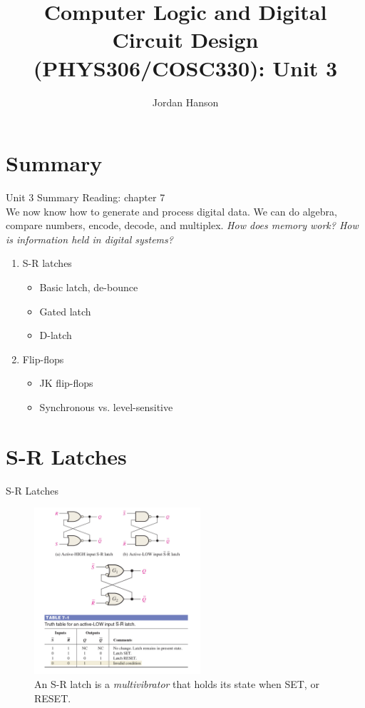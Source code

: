 \documentclass{beamer}
\title{Computer Logic and Digital Circuit Design (PHYS306/COSC330): Unit 3}
\author{Jordan Hanson}
\institute{Whittier College Department of Physics and Astronomy}
\begin{document}
\maketitle

\section{Summary}

\begin{frame}{Unit 3 Summary}
\alert{Reading: chapter 7} \\
We now know how to generate and process digital data. We can do algebra, compare numbers, encode, decode, and multiplex.  \textit{How does memory work?  How is information held in digital systems?}
\begin{enumerate}
\item S-R latches
\begin{itemize}
\item Basic latch, de-bounce
\item Gated latch
\item D-latch
\end{itemize}
\item Flip-flops
\begin{itemize}
\item JK flip-flops
\item Synchronous vs. level-sensitive
\end{itemize}
\end{enumerate}
\end{frame}

\section{S-R Latches}

\begin{frame}{S-R Latches}
\begin{figure}
\centering
\includegraphics[width=0.55\textwidth]{figures/SR1.pdf}
\caption{\label{fig:sr1} An S-R latch is a \textit{multivibrator} that holds its state when SET, or RESET.}
\end{figure}
\end{frame}
\end{document}
